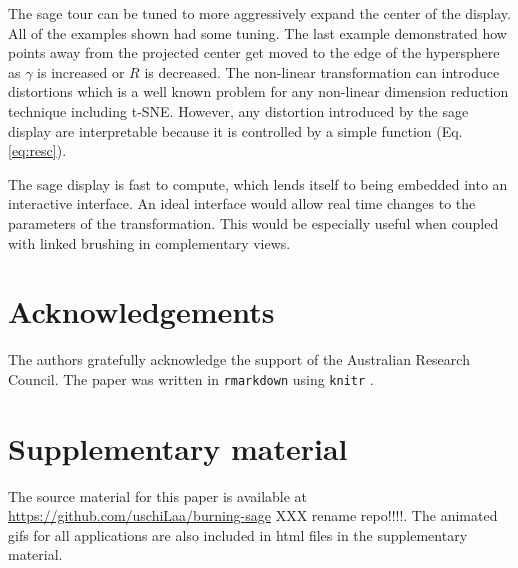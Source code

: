 \documentclass[]{interact}
\theoremstyle{plain}%
\theoremstyle{definition}
\theoremstyle{remark}
\begin{document}
The sage tour can be tuned to more aggressively expand the center of the
display. All of the examples shown had some tuning. The last example
demonstrated how points away from the projected center get moved to the
edge of the hypersphere as \(\gamma\) is increased or \(R\) is
decreased. The non-linear transformation can introduce distortions which
is a well known problem for any non-linear dimension reduction technique
including t-SNE. However, any distortion introduced by the sage display
are interpretable because it is controlled by a simple function (Eq.
\ref{eq:resc}).

The sage display is fast to compute, which lends itself to being
embedded into an interactive interface. An ideal interface would allow
real time changes to the parameters of the transformation. This would be
especially useful when coupled with linked brushing in complementary
views.

\hypertarget{acknowledgements}{%
\section*{Acknowledgements}\label{acknowledgements}}

The authors gratefully acknowledge the support of the Australian
Research Council. The paper was written in \texttt{rmarkdown}
\citep{rmarkdown} using \texttt{knitr} \citep{knitr}.

\hypertarget{supplementary-material}{%
\section*{Supplementary material}\label{supplementary-material}}

The source material for this paper is available at
\url{https://github.com/uschiLaa/burning-sage} XXX rename repo!!!!. The
animated gifs for all applications are also included in html files in
the supplementary material.



\end{document}
